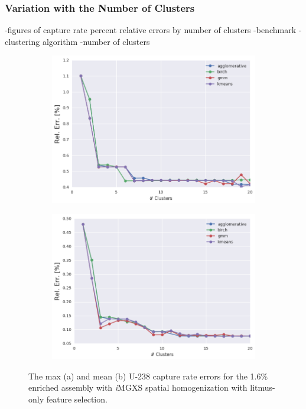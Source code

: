 \subsubsection{Variation with the Number of Clusters}
\label{subsec:chap11-imgxs-capt-rates-num-clusters}

-figures of capture rate percent relative errors by number of clusters
  -benchmark
  -clustering algorithm
  -number of clusters

\begin{figure}[h!]
\centering
\begin{subfigure}{0.9\textwidth}
  \centering
  \includegraphics[width=\linewidth]{figures/results/err-by-cluster/assm-16/max-rel-err}
  \caption{}
  \label{fig:chap11-max-capt-err-by-cluster-assm-16}
\end{subfigure}
\begin{subfigure}{0.9\textwidth}
  \centering
  \includegraphics[width=\linewidth]{figures/results/err-by-cluster/assm-16/mean-rel-err}
  \caption{}
  \label{fig:chap11-mean-capt-err-by-cluster-assm-16}
\end{subfigure}
\caption[U-238 capture rate errors for the 1.6\% enriched assembly]{The max (a) and mean (b) U-238 capture rate errors for the 1.6\% enriched assembly with \textit{i}\ac{MGXS} spatial homogenization with litmus-only feature selection.}
\label{fig:chap11-capt-err-by-cluster-assm-16}
\end{figure}

